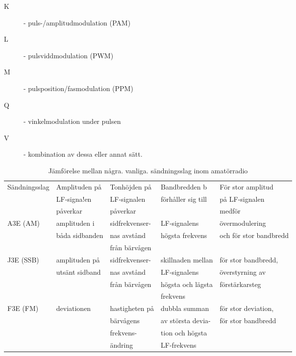 \begin{description}
\item[K] - puls-/amplitudmodulation (PAM)
\item[L] - pulsviddmodulation (PWM)
\item[M] - pulsposition/fasmodulation (PPM)
\item[Q] - vinkelmodulation under pulsen
\item[V] - kombination av dessa eller annat sätt.
\end{description}

\begin{table*}[h]
\begin{center}
\begin{tabular}{|l|l|l|l|l|}
\hline
Sändningsslag & Amplituden på & Tonhöjden på & Bandbredden b      & För stor amplitud \\
              & LF-signa!en   & LF-signalen  & förhåller sig till & på LF-signalen \\
              & påverkar      & påverkar     &                    & medför \\ \hline
A3E (AM) & amplituden i   & sidfrekvenser- & LF-signalens    & övermodulering \\
         & båda sidbanden & nas avstånd    & högsta frekvens & och för stor bandbredd \\
         &                & från bärvågen  & & \\
J3E (SSB)& amplituden på  & sidfrekvenser- & skillnaden mellan & för stor bandbredd,\\
         & utsänt sidband & nas avstånd    & LF-signalens      & överstyrning av\\
         &                & från bärvågen  & högsta och lägsta & förstärkarsteg\\
         &                &                & frekvens          & \\
F3E (FM) & deviationen    & hastigheten på & dubbla summan     & för stor deviation,\\
         &                & bärvågens      & av största devia- & för stor bandbredd\\
         &                & frekvens-      & tion och högsta   & \\
         &                & ändring        & LF-frekvens       & \\ \hline
\end{tabular}
\end{center}
\caption{Jämförelse mellan några. vanliga. sändningsslag inom amatörradio}
\end{table*}
